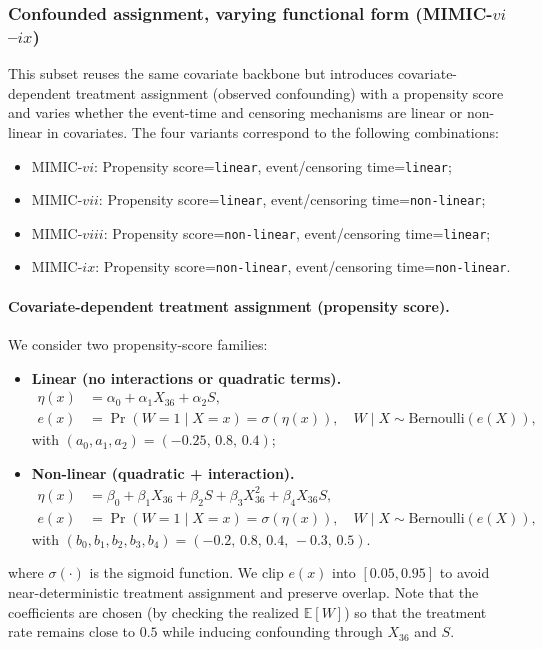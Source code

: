 \documentclass{article} %
\begin{document}

\subsubsection{Confounded assignment, varying functional form (MIMIC-$vi$--$ix$)}
\label{app:mimic-vi-ix}
This subset reuses the same covariate backbone but introduces covariate-dependent treatment assignment (observed confounding) with a propensity score and varies whether the event-time and censoring mechanisms are linear or non-linear in covariates. The four variants correspond to the following combinations:
\begin{itemize}
    \item MIMIC-$vi$: Propensity score=\texttt{linear}, event/censoring time=\texttt{linear};
    \item MIMIC-$vii$: Propensity score=\texttt{linear}, event/censoring time=\texttt{non-linear};
    \item MIMIC-$viii$: Propensity score=\texttt{non-linear}, event/censoring time=\texttt{linear};
    \item MIMIC-$ix$: Propensity score=\texttt{non-linear}, event/censoring time=\texttt{non-linear}.
\end{itemize}

\paragraph{Covariate-dependent treatment assignment (propensity score).}
We consider two propensity-score families:
\begin{itemize}
    \item \textbf{Linear (no interactions or quadratic terms).}
    \begin{align*}
        \eta(x) &= \alpha_0+\alpha_1 X_{36}+\alpha_2 S,\\
        e(x) &= \Pr(W=1\mid X=x)=\sigma(\eta(x)),\quad
        W\mid X \sim \mathrm{Bernoulli}(e(X)),
    \end{align*}
    with $(a_0,a_1,a_2)=(-0.25,\,0.8,\,0.4)$;
    \item \textbf{Non-linear (quadratic + interaction).}
    \begin{align*}
        \eta(x) &= \beta_0 + \beta_1 X_{36} + \beta_2 S + \beta_3 X_{36}^2 + \beta_4 X_{36} S,\\
        e(x) &= \Pr(W=1\mid X=x)=\sigma(\eta(x)),\quad
        W\mid X \sim \mathrm{Bernoulli}(e(X)),
    \end{align*}
    with $(b_0,b_1,b_2,b_3,b_4)=(-0.2,\,0.8,\,0.4,\,-0.3,\,0.5)$.
\end{itemize}
where $\sigma(\cdot)$ is the sigmoid function. We clip $e(x)$ into $[0.05,0.95]$ to avoid near-deterministic treatment assignment and preserve overlap. Note that the coefficients are chosen (by checking the realized $\mathbb{E}[W]$) so that the treatment rate remains close to $0.5$ while inducing confounding through $X_{36}$ and $S$.
\end{document}
